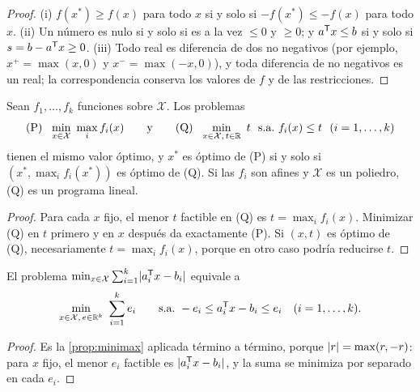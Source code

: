 \begin{proof}
(i) $f(x^{*})\ge f(x)$ para todo $x$ si y solo si $-f(x^{*})\le -f(x)$ para todo $x$. (ii) Un número es nulo si y solo si es a la vez $\le 0$ y $\ge 0$; y $a^{\mathsf{T}} x\le b$ si y solo si $s=b-a^{\mathsf{T}} x\ge 0$. (iii) Todo real es diferencia de dos no negativos (por ejemplo, $x^{+}=\max(x,0)$ y $x^{-}=\max(-x,0)$), y toda diferencia de no negativos es un real; la correspondencia conserva los valores de $f$ y de las restricciones.
\end{proof}

\begin{proposicion}\label{prop:minimax}
Sean $f_1,\dots,f_k$ funciones sobre $\mathcal{X}$. Los problemas
\[
\text{(P)}\ \ \min_{x\in\mathcal{X}}\ \max_{i}f_i(x)\qquad\text{y}\qquad \text{(Q)}\ \ \min_{x\in\mathcal{X},\,t\in\R}\ t\ \ \st f_i(x)\le t\ \ (i=1,\dots,k)
\]
tienen el mismo valor óptimo, y $x^{*}$ es óptimo de (P) si y solo si $(x^{*},\max_i f_i(x^{*}))$ es óptimo de (Q). Si las $f_i$ son afines y $\mathcal{X}$ es un poliedro, (Q) es un programa lineal.
\end{proposicion}

\begin{proof}
Para cada $x$ fijo, el menor $t$ factible en (Q) es $t=\max_i f_i(x)$. Minimizar (Q) en $t$ primero y en $x$ después da exactamente (P). Si $(x,t)$ es óptimo de (Q), necesariamente $t=\max_if_i(x)$, porque en otro caso podría reducirse $t$.
\end{proof}

\begin{proposicion}\label{prop:abs}
El problema $\min_{x\in\mathcal{X}}\sum_{i=1}^{k}\lvert a_i^{\mathsf{T}} x-b_i\rvert$ equivale a
\[
\min_{x\in\mathcal{X},\,e\in\R^{k}}\ \sum_{i=1}^{k}e_i\qquad\st -e_i\le a_i\T x-b_i\le e_i\quad(i=1,\dots,k).
\]
\end{proposicion}

\begin{proof}
Es la \cref{prop:minimax} aplicada término a término, porque $\lvert r\rvert=\max(r,-r)$: para $x$ fijo, el menor $e_i$ factible es $\lvert a_i^{\mathsf{T}} x-b_i\rvert$, y la suma se minimiza por separado en cada $e_i$.
\end{proof}

